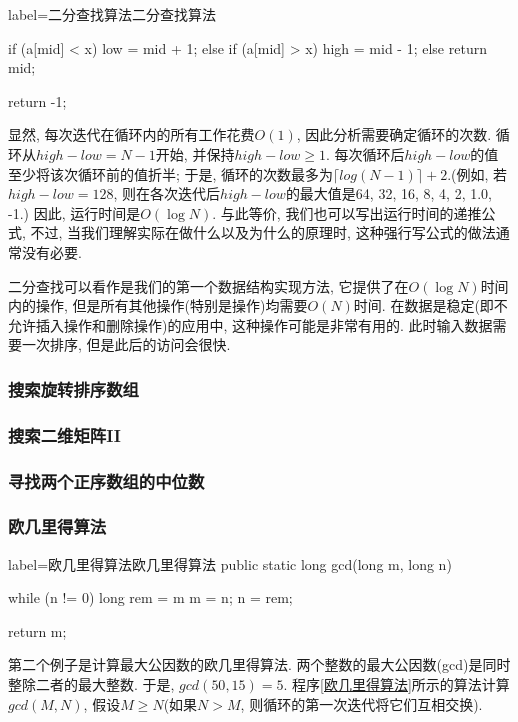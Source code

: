 \documentclass[oneside]{ctexbook}
\begin{document}
{\begin{myjava}{label={二分查找算法}}{二分查找算法}
{{        if (a[mid] < x) {
            low = mid + 1;
        } else if (a[mid] > x) {
            high = mid - 1;
        } else {
            return mid;
        }
    }

    return -1;
}
\end{myjava}

显然, 每次迭代在循环内的所有工作花费$O(1)$, 因此分析需要确定循环的次数. 循环从$high-low=N-1$开始, 并保持$high-low\geq 1$. 每次循环后$high-low$的值至少将该次循环前的值折半; 于是, 循环的次数最多为$\lceil log(N-1)\rceil +2$.(例如, 若$high-low=128$, 则在各次迭代后$high-low$的最大值是64, 32, 16, 8, 4, 2, 1.0, -1.) 因此, 运行时间是$O(\log{N})$. 与此等价, 我们也可以写出运行时间的递推公式, 不过, 当我们理解实际在做什么以及为什么的原理时, 这种强行写公式的做法通常没有必要.

二分查找可以看作是我们的第一个数据结构实现方法, 它提供了在$O(\log{N})$时间内的操作, 但是所有其他操作(特别是操作)均需要$O(N)$时间. 在数据是稳定(即不允许插入操作和删除操作)的应用中, 这种操作可能是非常有用的. 此时输入数据需要一次排序, 但是此后的访问会很快.

\subsubsection{搜索旋转排序数组}

\subsubsection{搜索二维矩阵II}

\subsubsection{寻找两个正序数组的中位数}

\subsubsection{欧几里得算法}

\begin{myjava}{label={欧几里得算法}}{欧几里得算法}
public static long gcd(long m, long n) {
    while (n != 0) {
        long rem = m %
        m = n;
        n = rem;
    }

    return m;
}
\end{myjava}

第二个例子是计算最大公因数的欧几里得算法. 两个整数的最大公因数(gcd)是同时整除二者的最大整数. 于是, $gcd(50,15)=5$. 程序\ref{欧几里得算法}所示的算法计算$gcd(M,N)$, 假设$M\geq N$(如果$N>M$, 则循环的第一次迭代将它们互相交换).

}
\end{document}
